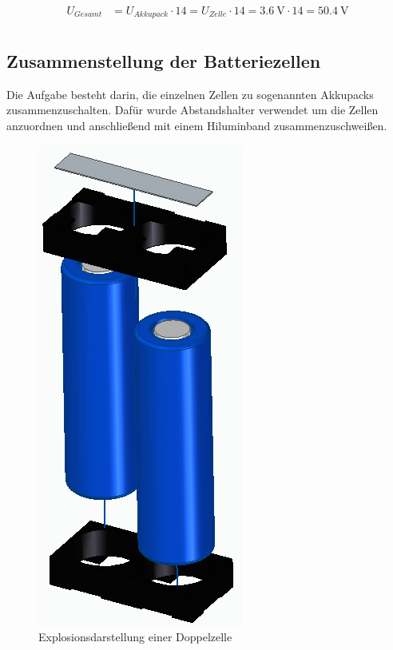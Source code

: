 \begin{align*}
U_{Gesamt} &= U_{Akkupack} \cdot 14= U_{Zelle} \cdot 14= 3.6~\mathrm{V} \cdot 14 = 50.4~\mathrm{V}\\
\end{align*}
\newpage

\subsection{Zusammenstellung der Batteriezellen}
Die Aufgabe besteht darin, die einzelnen Zellen zu sogenannten Akkupacks zusammenzuschalten. Dafür wurde Abstandshalter verwendet um die Zellen anzuordnen und anschließend mit einem Hiluminband zusammenzuschweißen. 

\begin{figure}[H]
	\begin{center}
		\includegraphics[scale=0.5]{figures/Akku/Explosionsdarstellung2Zellen.PNG}
		\caption{Explosionsdarstellung einer Doppelzelle}
		\label{fig: Explosionsdarstellung einer Doppelzelle}
	\end{center}
\end{figure}

